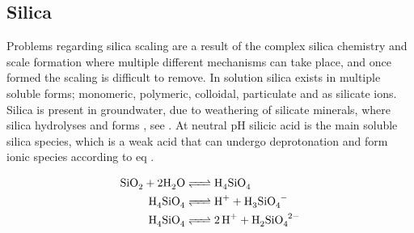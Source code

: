
\subsection{Silica}
\label{Silica_teori_ladning}



Problems regarding silica scaling are a result of the complex silica chemistry and scale formation where multiple different mechanisms can take place, and once formed the scaling is difficult to remove. \citep{ChemistrySilicaScale2014}
In solution silica exists in multiple soluble forms; monomeric, polymeric, %
colloidal, %
particulate %
and as silicate ions. 
Silica  is present in groundwater, due to weathering of silicate minerals, where silica hydrolyses and forms , see . \citep{ChemistrySilicaScale2014}
At neutral pH silicic acid  is the main soluble silica species, which is a weak acid that can undergo deprotonation and form ionic species according to eq . \citep{ChemistrySilicaScale2014}

\begin{align}
    \cee{ SiO2 + 2 H2O &<=> H4SiO4} \\
    \cee{H4SiO4 &<=> H+ + H3SiO4-}\\ 
   \cee{H4SiO4 &<=> 2H+ + H2SiO4^{2-}} 
\end{align}

